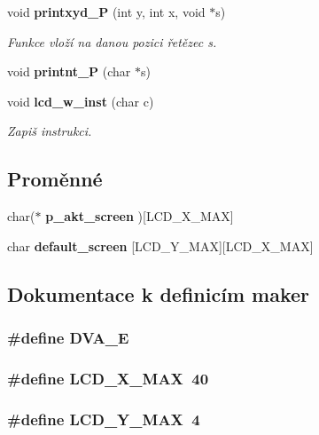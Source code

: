 \begin{DoxyCompactItemize}
void {\bf printxyd\_\-P} (int y, int x, void $\ast$s)
\begin{DoxyCompactList}\small\item\em Funkce vloží na danou pozici řetězec {\itshape s\/}. \item\end{DoxyCompactList}\item 
void {\bf printnt\_\-P} (char $\ast$s)
\item 
void {\bf lcd\_\-w\_\-inst} (char c)
\begin{DoxyCompactList}\small\item\em Zapiš instrukci. \item\end{DoxyCompactList}\end{DoxyCompactItemize}
\subsection*{Proměnné}
\begin{DoxyCompactItemize}
\item 
char($\ast$ {\bf p\_\-akt\_\-screen} )[LCD\_\-X\_\-MAX]
\item 
char {\bf default\_\-screen} [LCD\_\-Y\_\-MAX][LCD\_\-X\_\-MAX]
\end{DoxyCompactItemize}


\subsection{Dokumentace k definicím maker}
\subsubsection[{DVA\_\-E}]{\setlength{\rightskip}{0pt plus 5cm}\#define DVA\_\-E}\label{lcd_8h_aff26c292d8bc1fa5c6cf136b7f73b557}
\subsubsection[{LCD\_\-X\_\-MAX}]{\setlength{\rightskip}{0pt plus 5cm}\#define LCD\_\-X\_\-MAX~40}\label{lcd_8h_a1d9ba2d8f9cc2124ff29e24abbe2c90d}
\subsubsection[{LCD\_\-Y\_\-MAX}]{\setlength{\rightskip}{0pt plus 5cm}\#define LCD\_\-Y\_\-MAX~4}\label{lcd_8h_ad14583f7d91ea48ff9f3e6ec9a920a11}


